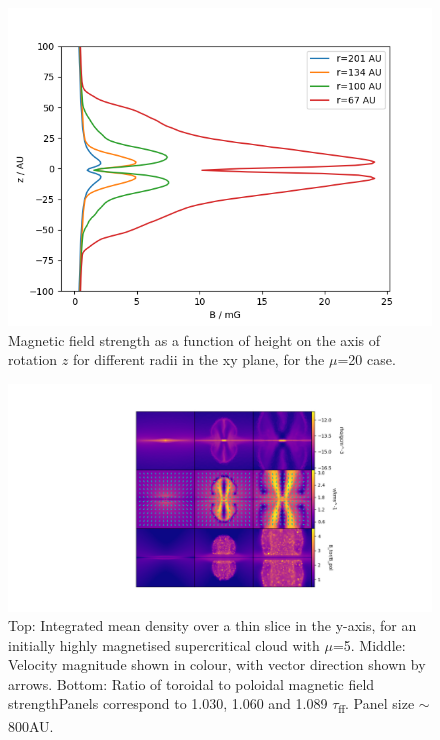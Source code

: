\documentclass[11pt]{article}
\begin{document}
\begin{figure}[h!]
         \centering
		\includegraphics[width=13cm]{BvsZ_mu20.png}
		\caption{Magnetic field strength as a function of height on the axis of rotation $z$ for different radii in the xy plane, for the $\mu$=20 case.}
		\label{fig:BvsZ}
\end{figure}


\begin{figure}[h!]
         \centering
		\includegraphics[width=18cm]{burzle2.png}
		\caption{Top: Integrated mean density over a thin slice in the y-axis, for an initially highly magnetised supercritical cloud with $\mu$=5. Middle: Velocity magnitude shown in colour, with vector direction shown by arrows. Bottom: Ratio of toroidal to poloidal magnetic field strengthPanels correspond to 1.030, 1.060 and 1.089 $\tau$\textsubscript{ff}. Panel size $\sim$800AU.}
		\label{fig:burzle2}
\end{figure}
\end{document}
